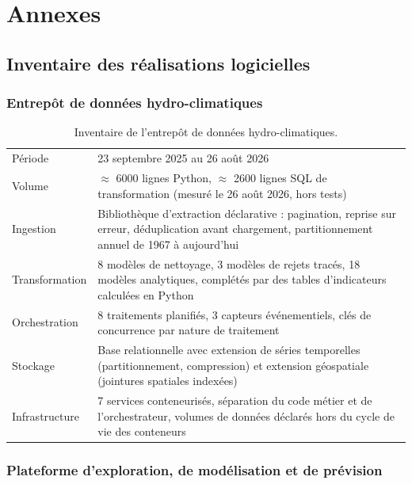\chapter{Annexes}
\label{ch:annexes}

\section{Inventaire des réalisations logicielles}

\subsection{Entrepôt de données hydro-climatiques}

\begin{table}[H]
\centering
\caption{Inventaire de l'entrepôt de données hydro-climatiques.}
\label{tab:inv-entrepot}
\begin{tabularx}{\textwidth}{@{}lX@{}}
\toprule
Période & 23 septembre 2025 au 26 août 2026 \\
Volume & $\approx$ \num{6000} lignes Python, $\approx$ \num{2600} lignes SQL de transformation (mesuré le 26 août 2026, hors tests) \\
Ingestion & Bibliothèque d'extraction déclarative : pagination, reprise sur erreur,
déduplication avant chargement, partitionnement annuel de 1967 à aujourd'hui \\
Transformation & 8 modèles de nettoyage, 3 modèles de rejets tracés, 18 modèles analytiques,
complétés par des tables d'indicateurs calculées en Python \\
Orchestration & 8 traitements planifiés, 3 capteurs événementiels, clés de concurrence par
nature de traitement \\
Stockage & Base relationnelle avec extension de séries temporelles (partitionnement,
compression) et extension géospatiale (jointures spatiales indexées) \\
Infrastructure & 7 services conteneurisés, séparation du code métier et de l'orchestrateur,
volumes de données déclarés hors du cycle de vie des conteneurs \\
\bottomrule
\end{tabularx}
\end{table}

\subsection{Plateforme d'exploration, de modélisation et de prévision}

